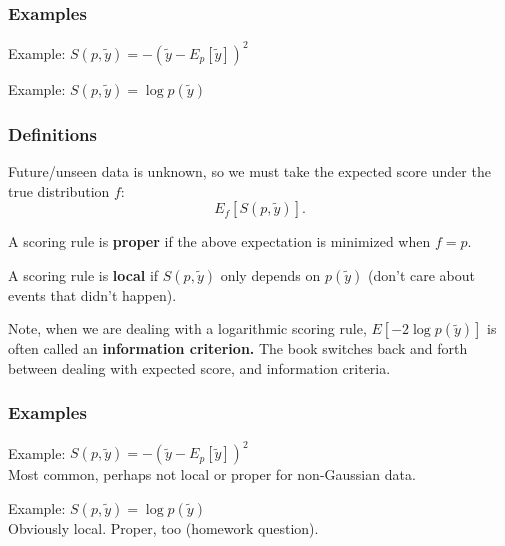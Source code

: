 \documentclass{beamer}
\begin{document}
\begin{frame}
\frametitle{Examples}


Example: $S(p,\tilde{y}) = -(\tilde{y} - E_p[\tilde{y}])^2$
\newline


Example: $S(p,\tilde{y}) = \log p(\tilde{y})$
\newline


\end{frame}

\begin{frame}
\frametitle{Definitions}

Future/unseen data is unknown, so we must take the expected score under the true distribution $f$:
$$
E_f[S(p,\tilde{y})].
$$

A scoring rule is {\bf proper} if the above expectation is minimized when $f = p$.
\newline

A scoring rule is {\bf local} if $S(p,\tilde{y})$ only depends on $p(\tilde{y})$ (don't care about events that didn't happen).
\newline

Note, when we are dealing with a logarithmic scoring rule, $E[-2\log p(\tilde{y})]$ is often called an {\bf information criterion.} The book switches back and forth between dealing with expected score, and information criteria. 

\end{frame}

\begin{frame}
\frametitle{Examples}


Example: $S(p,\tilde{y}) = -(\tilde{y} - E_p[\tilde{y}])^2$ \\
Most common, perhaps not local or proper for non-Gaussian data.
\newline

Example: $S(p,\tilde{y}) = \log p(\tilde{y})$\\
Obviously local. Proper, too (homework question).


\end{frame}
\end{document}
